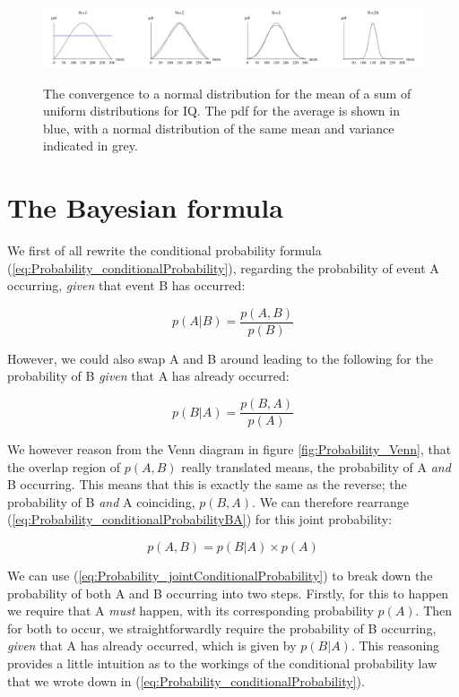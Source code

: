 \documentclass[11pt,fullpage]{book}
\begin{document}
\begin{figure}
\centering
\scalebox{0.4} 
{\includegraphics{Probability_CLTNormalSum.pdf}}
\caption{The convergence to a normal distribution for the mean of a sum of uniform distributions for IQ. The pdf for the average is shown in blue, with a normal distribution of the same mean and variance indicated in grey.}\label{fig:Probability_CLTNormalSum}
\end{figure}

\section{The Bayesian formula}\label{sec:Probability_BayesianFormula}
We first of all rewrite the conditional probability formula (\ref{eq:Probability_conditionalProbability}), regarding the probability of event A occurring, \textit{given} that event B has occurred:

\begin{equation}\label{eq:Probability_conditionalProbabilityAB}
p(A|B) = \frac{p(A,B)}{p(B)}
\end{equation}

However, we could also swap A and B around leading to the following for the probability of B \textit{given} that A has already occurred:

\begin{equation}\label{eq:Probability_conditionalProbabilityBA}
p(B|A) = \frac{p(B,A)}{p(A)}
\end{equation}

We however reason from the Venn diagram in figure \ref{fig:Probability_Venn}, that the overlap region of $p(A,B)$ really translated means, the probability of A \textit{and} B occurring. This means that this is exactly the same as the reverse; the probability of B \textit{and} A coinciding, $p(B,A)$. We can therefore rearrange (\ref{eq:Probability_conditionalProbabilityBA}) for this joint probability:

\begin{equation}\label{eq:Probability_jointConditionalProbability}
p(A,B) = p(B|A)\times p(A)
\end{equation}

We can use (\ref{eq:Probability_jointConditionalProbability}) to break down the probability of both A and B occurring into two steps. Firstly, for this to happen we require that A \textit{must} happen, with its corresponding probability $p(A)$. Then for both to occur, we straightforwardly require the probability of B occurring, \textit{given} that A has already occurred, which is given by $p(B|A)$. This reasoning provides a little intuition as to the workings of the conditional probability law that we wrote down in (\ref{eq:Probability_conditionalProbability}).
\end{document}
